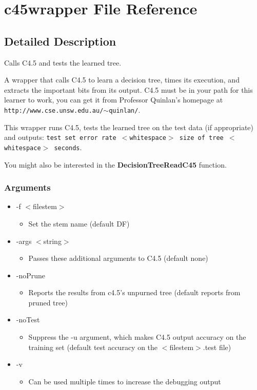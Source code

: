 \section{c45wrapper File Reference}
\label{c45wrapper}


\subsection{Detailed Description}
Calls C4.5 and tests the learned tree. 

A wrapper that calls C4.5 to learn a decision tree, times its execution, and extracts the important bits from its output. C4.5 must be in your path for this learner to work, you can get it from Professor Quinlan's homepage at {\tt http://www.cse.unsw.edu.au/$\sim$quinlan/}.

This wrapper runs C4.5, tests the learned tree on the test data (if appropriate) and outputs: {\tt test set error rate $<$whitespace$>$ size of tree $<$whitespace$>$ seconds}.

You might also be interested in the {\bf Decision\-Tree\-Read\-C45} function.

\subsubsection*{Arguments}

\begin{itemize}
\item -f $<$filestem$>$\begin{itemize}
\item Set the stem name (default DF)\end{itemize}
\item -args $<$string$>$\begin{itemize}
\item Passes these additional arguments to C4.5 (default none)\end{itemize}
\item -no\-Prune\begin{itemize}
\item Reports the results from c4.5's unpurned tree (default reports from pruned tree)\end{itemize}
\item -no\-Test\begin{itemize}
\item Suppress the -u argument, which makes C4.5 output accuracy on the training set (default test accuracy on the $<$filestem$>$.test file)\end{itemize}
\item -v\begin{itemize}
\item Can be used multiple times to increase the debugging output\end{itemize}
\end{itemize}


